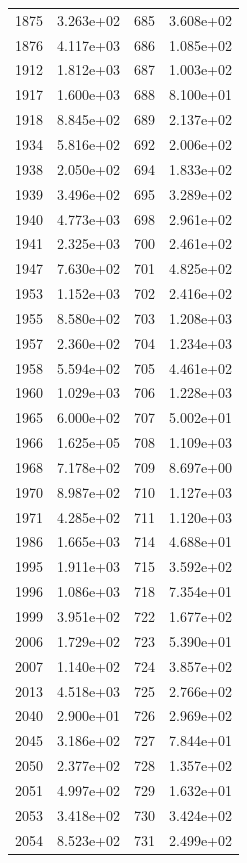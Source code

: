 \documentclass[12pt]{article}
\begin{document}
\begin{longtable}{@{}cccc@{}}
1875 & 3.263e+02 & 685 & 3.608e+02 \\
1876 & 4.117e+03 & 686 & 1.085e+02 \\
1912 & 1.812e+03 & 687 & 1.003e+02 \\
1917 & 1.600e+03 & 688 & 8.100e+01 \\
1918 & 8.845e+02 & 689 & 2.137e+02 \\
1934 & 5.816e+02 & 692 & 2.006e+02 \\
1938 & 2.050e+02 & 694 & 1.833e+02 \\
1939 & 3.496e+02 & 695 & 3.289e+02 \\
1940 & 4.773e+03 & 698 & 2.961e+02 \\
1941 & 2.325e+03 & 700 & 2.461e+02 \\
1947 & 7.630e+02 & 701 & 4.825e+02 \\
1953 & 1.152e+03 & 702 & 2.416e+02 \\
1955 & 8.580e+02 & 703 & 1.208e+03 \\
1957 & 2.360e+02 & 704 & 1.234e+03 \\
1958 & 5.594e+02 & 705 & 4.461e+02 \\
1960 & 1.029e+03 & 706 & 1.228e+03 \\
1965 & 6.000e+02 & 707 & 5.002e+01 \\
1966 & 1.625e+05 & 708 & 1.109e+03 \\
1968 & 7.178e+02 & 709 & 8.697e+00 \\
1970 & 8.987e+02 & 710 & 1.127e+03 \\
1971 & 4.285e+02 & 711 & 1.120e+03 \\
1986 & 1.665e+03 & 714 & 4.688e+01 \\
1995 & 1.911e+03 & 715 & 3.592e+02 \\
1996 & 1.086e+03 & 718 & 7.354e+01 \\
1999 & 3.951e+02 & 722 & 1.677e+02 \\
2006 & 1.729e+02 & 723 & 5.390e+01 \\
2007 & 1.140e+02 & 724 & 3.857e+02 \\
2013 & 4.518e+03 & 725 & 2.766e+02 \\
2040 & 2.900e+01 & 726 & 2.969e+02 \\
2045 & 3.186e+02 & 727 & 7.844e+01 \\
2050 & 2.377e+02 & 728 & 1.357e+02 \\
2051 & 4.997e+02 & 729 & 1.632e+01 \\
2053 & 3.418e+02 & 730 & 3.424e+02 \\
2054 & 8.523e+02 & 731 & 2.499e+02 \\

\end{longtable}
\end{document}
